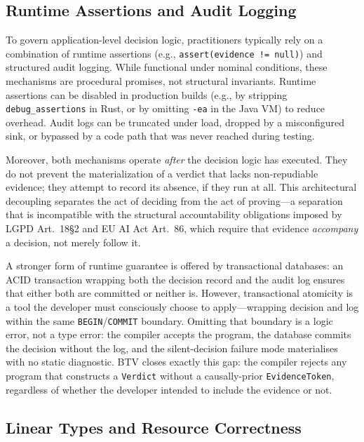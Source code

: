 \subsection{Runtime Assertions and Audit Logging}
\label{sec:runtime}

To govern application-level decision logic, practitioners
typically rely on a combination of runtime assertions
(e.g., \texttt{assert(evidence != null)}) and structured
audit logging.
While functional under nominal conditions, these mechanisms are
procedural promises, not structural invariants.
Runtime assertions can be disabled in production builds
(e.g., by stripping \texttt{debug\_assertions} in Rust, or by
omitting \texttt{-ea} in the Java VM) to reduce overhead.
Audit logs can be truncated under load, dropped by a misconfigured
sink, or bypassed by a code path that was never reached during
testing.

Moreover, both mechanisms operate \emph{after} the decision logic
has executed.
They do not prevent the materialization of a verdict that lacks
non-repudiable evidence; they attempt to record its absence, if they
run at all.
This architectural decoupling separates the act of deciding from the
act of proving---a separation that is incompatible with the
structural accountability obligations imposed by LGPD Art.~18\S2 and
EU AI Act Art.~86, which require that evidence \emph{accompany} a
decision, not merely follow it.

A stronger form of runtime guarantee is offered by transactional
databases: an ACID transaction wrapping both the decision record and
the audit log ensures that either both are committed or neither is.
However, transactional atomicity is a tool the developer must
consciously choose to apply---wrapping decision and log within the
same \texttt{BEGIN}/\texttt{COMMIT} boundary.
Omitting that boundary is a logic error, not a type error: the
compiler accepts the program, the database commits the decision
without the log, and the silent-decision failure mode materialises
with no static diagnostic.
BTV closes exactly this gap: the compiler rejects any program that
constructs a \texttt{Verdict} without a causally-prior
\texttt{EvidenceToken}, regardless of whether the developer intended
to include the evidence or not.

\subsection{Linear Types and Resource Correctness}
\label{sec:linear_related}

